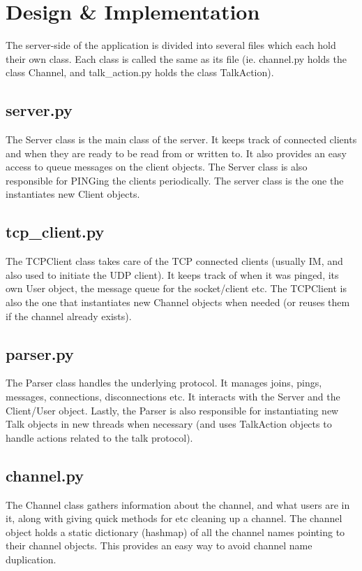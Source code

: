 \documentclass[12pt]{rapport}
\begin{document}
\section*{Design \& Implementation}
The server-side of the application is divided into several files which each hold their own class. Each class is called the same as its file (ie. channel.py holds the class Channel, and talk\_action.py holds the class TalkAction).

\subsection*{server.py}
The Server class is the main class of the server. It keeps track of connected clients and when they are ready to be read from or written to. It also provides an easy access to queue messages on the client objects. The Server class is also responsible for PINGing the clients periodically. The server class is the one the instantiates new Client objects.

\subsection*{tcp\_client.py}
The TCPClient class takes care of the TCP connected clients (usually IM, and also used to initiate the UDP client). It keeps track of when it was pinged, its own User object, the message queue for the socket/client etc. The TCPClient is also the one that instantiates new Channel objects when needed (or reuses them if the channel already exists).

\subsection*{parser.py}
The Parser class handles the underlying protocol. It manages joins, pings, messages, connections, disconnections etc. It interacts with the Server and the Client/User object. Lastly, the Parser is also responsible for instantiating new Talk objects in new threads when necessary (and uses TalkAction objects to handle actions related to the talk protocol).

\subsection*{channel.py}
The Channel class gathers information about the channel, and what users are in it, along with giving quick methods for etc cleaning up a channel. The channel object holds a static dictionary (hashmap) of all the channel names pointing to their channel objects. This provides an easy way to avoid channel name duplication.
\end{document}
